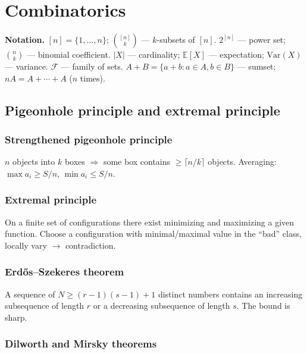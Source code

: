 \chapter{Combinatorics}
\label{ch:combinatorics}

\medskip

\textbf{Notation.} $[n]=\{1,\dots,n\}$; $\binom{[n]}{k}$ --- $k$-subsets of $[n]$.
$2^{[n]}$ --- power set; $\binom{n}{k}$ --- binomial coefficient.
$|X|$ --- cardinality; $\mathbb{E}[X]$ --- expectation; $\mathrm{Var}(X)$ --- variance.
$\mathcal{F}$ --- family of sets.
$A+B=\{a+b:a\in A,b\in B\}$ --- sumset; $nA=A+\cdots+A$ ($n$ times).

\medskip

\section{Pigeonhole principle and extremal principle}
\label{sec:pigeonhole}

\subsection{Strengthened pigeonhole principle}
\label{subsec:strengthened-pigeonhole}

$n$ objects into $k$ boxes $\Rightarrow$ some box contains $\ge\lceil n/k\rceil$ objects. Averaging: $\max a_i\ge S/n$, $\min a_i\le S/n$.

\subsection{Extremal principle}
\label{subsec:extremal-principle}

On a finite set of configurations there exist minimizing and maximizing a given function. Choose a configuration with minimal/maximal value in the ``bad'' class, locally vary $\to$ contradiction.

\subsection{Erd\H{o}s--Szekeres theorem}
\label{subsec:erdos-szekeres}

A sequence of $N\ge (r-1)(s-1)+1$ distinct numbers contains an increasing subsequence of length $r$ or a decreasing subsequence of length $s$. The bound is sharp.

\subsection{Dilworth and Mirsky theorems}
\label{subsec:dilworth-mirsky}


